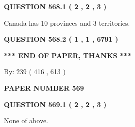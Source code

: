 \documentclass[12pt]{article}
\begin{document}
   
  
\vspace{0.2in}
  
{\textbf{\Large{QUESTION
568.1 
 ( 2 , 2 , 3 )
}}}
  
  
 
 
\noindent{}
 
 
Canada has 10  provinces and 3 territories.
 
 
 
 
  
\vspace{0.2in}
  
{\textbf{\Large{QUESTION
568.2 
 ( 1 , 1 , 6791 )
}}}
  
  
   
   
 \vspace{0.2in}
 
   
   
   
   
\vspace{1.0in} 
{\textbf{\large{ *** END OF PAPER, THANKS *** }}} 
   
   
\hspace{1.0in} By: 
 239 ( 416 ,  613 )
   
   
   
   
\newpage 
\setcounter{page}{ 
   569001 } 
   
   
   
   
 {\textbf{ \Large{ PAPER NUMBER  569  }}}
   
   
\vspace{0.2in}
   
   
   
   
   
   
 \vspace{0.2in}
 
 
 
 
   
   
  
\vspace{0.2in}
  
{\textbf{\Large{QUESTION
569.1 
 ( 2 , 2 , 3 )
}}}
  
  
 
 
\noindent{}
 
 
 None of above.
 
\end{document}
